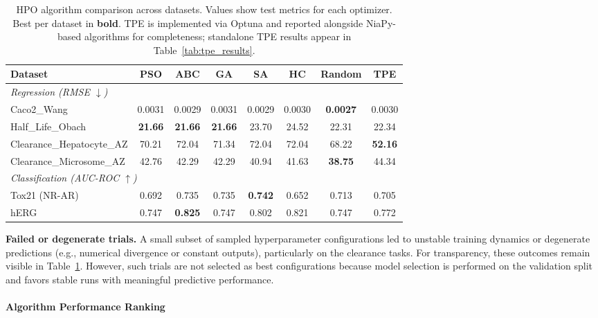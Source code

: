 \documentclass[12pt]{article}
\begin{document}
\begin{table}[t]
\centering
\caption{HPO algorithm comparison across datasets. Values show test metrics for each optimizer. Best per dataset in \textbf{bold}. TPE is implemented via Optuna and reported alongside NiaPy-based algorithms for completeness; standalone TPE results appear in Table~\ref{tab:tpe_results}.}
\label{tab:hpo_results}
\scriptsize
\begin{tabular}{lccccccc}
\toprule
\textbf{Dataset} & \textbf{PSO} & \textbf{ABC} & \textbf{GA} & \textbf{SA} & \textbf{HC} & \textbf{Random} & \textbf{TPE} \\
\midrule
\multicolumn{8}{l}{\emph{Regression (RMSE $\downarrow$)}} \\
\midrule
Caco2\_Wang & 0.0031 & 0.0029 & 0.0031 & 0.0029 & 0.0030 & \textbf{0.0027} & 0.0030 \\
Half\_Life\_Obach & \textbf{21.66} & \textbf{21.66} & \textbf{21.66} & 23.70 & 24.52 & 22.31 & 22.34 \\
Clearance\_Hepatocyte\_AZ & 70.21 & 72.04 & 71.34 & 72.04 & 72.04 & 68.22 & \textbf{52.16} \\
Clearance\_Microsome\_AZ & 42.76 & 42.29 & 42.29 & 40.94 & 41.63 & \textbf{38.75} & 44.34 \\
\midrule
\multicolumn{8}{l}{\emph{Classification (AUC-ROC $\uparrow$)}} \\
\midrule
Tox21 (NR-AR) & 0.692 & 0.735 & 0.735 & \textbf{0.742} & 0.652 & 0.713 & 0.705 \\
hERG & 0.747 & \textbf{0.825} & 0.747 & 0.802 & 0.821 & 0.747 & 0.772 \\
\bottomrule
\end{tabular}
\end{table}

\noindent\textbf{Failed or degenerate trials.}
A small subset of sampled hyperparameter configurations led to unstable training dynamics or degenerate predictions (e.g., numerical divergence or constant outputs), particularly on the clearance tasks. For transparency, these outcomes remain visible in Table~\ref{tab:hpo_results}. However, such trials are not selected as best configurations because model selection is performed on the validation split and favors stable runs with meaningful predictive performance.


\paragraph{Algorithm Performance Ranking}
\end{document}

